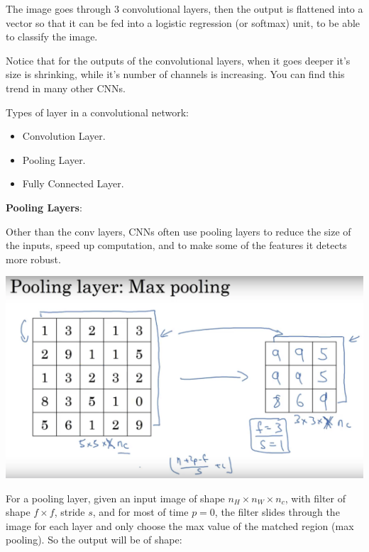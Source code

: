 \documentclass{article}
\begin{document}
\noindent The image goes through 3 convolutional layers, then the output is flattened into a vector so that it can be fed into a logistic regression (or softmax) unit, to be able to classify the image.

\bigskip

\noindent Notice that for the outputs of the convolutional layers, when it goes deeper it's size is shrinking, while it's number of channels is increasing. You can find this trend in many other CNNs.

\bigskip

\noindent Types of layer in a convolutional network:

\begin{itemize}
    \item Convolution Layer.
    \item Pooling Layer.
    \item Fully Connected Layer.
\end{itemize}

\noindent \textbf{Pooling Layers}:

\noindent Other than the conv layers, CNNs often use pooling layers to reduce the size of the inputs, speed up computation, and to make some of the features it detects more robust.

\begin{center}
\includegraphics[scale=0.6]{./images/max_pooling.png}
\end{center}

\noindent For a pooling layer, given an input image of shape \(n_{H} \times n_{W} \times n_{c}\), with filter of shape \(f \times f\), stride \(s\), and for most of time \(p = 0\), the filter slides through the image for each layer and only choose the max value of the matched region (max pooling). So the output will be of shape:
\end{document}
